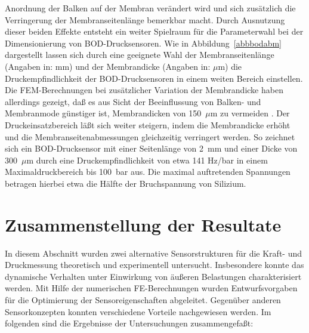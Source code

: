 Anordnung der Balken auf der Membran verändert wird und sich zusätzlich
die Verringerung der Membranseitenlänge bemerkbar macht.
Durch Ausnutzung dieser beiden Effekte entsteht ein weiter Spielraum für
die Parameterwahl bei der Dimensionierung von BOD-Drucksensoren.
Wie in Abbildung~\ref{abbbodabm} dargestellt lassen sich durch eine
geeignete Wahl der Membranseitenlänge (Angaben in: mm) und der Membrandicke
(Angaben in: $\mu$m) die Druckempfindlichkeit der BOD-Drucksensoren in einem
weiten Bereich einstellen. Die FEM-Berechnungen bei zusätzlicher Variation
der Membrandicke haben allerdings gezeigt, daß es aus Sicht der Beeinflussung
von Balken- und Membranmode günstiger ist, Membrandicken von 150~$\mu$m
zu vermeiden \cite{Messner}. Der Druckeinsatzbereich läßt sich weiter
steigern, indem die Membrandicke erhöht und die Membranseitenabmessungen
gleichzeitig verringert werden. So zeichnet
sich ein BOD-Drucksensor mit einer Seitenlänge von 2~mm und einer Dicke von
300~$\mu$m durch eine Druckempfindlichkeit von etwa 141 Hz/bar in einem
Maximaldruckbereich bis 100~bar aus. Die maximal auftretenden Spannungen
betragen hierbei etwa die Hälfte der Bruchspannung von Silizium.




\newpage
\section{Zusammenstellung der Resultate}

In diesem Abschnitt wurden zwei alternative Sensorstrukturen für die Kraft-
und Druckmessung theoretisch und experimentell untersucht. Insbesondere
konnte das dynamische Verhalten unter Einwirkung von äußeren Belastungen
charakterisiert werden. Mit Hilfe der numerischen FE-Berechnungen wurden
Entwurfsvorgaben für die Optimierung der
Sensor\-eigenschaften abgeleitet. Gegenüber anderen Sensorkonzepten konnten
verschiedene Vorteile nachgewiesen werden. Im folgenden sind die Ergebnisse
der Untersuchungen zusammengefaßt:

